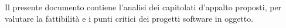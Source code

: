 Il presente documento contiene l'analisi dei capitolati d'appalto proposti, per valutare la fattibilità e i punti critici dei progetti software in oggetto.
